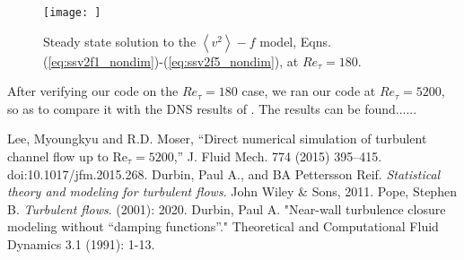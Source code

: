 \documentclass[a4paper,11pt]{article}
\newcommand{\chevron}[1]{\left\langle #1 \right\rangle}
\begin{document}
\begin{figure}
 \centering
 \texttt{[image: ]}
 \caption{Steady state solution to the $\chevron{v^2}-f$ model, Eqns.
(\ref{eq:ssv2f1_nondim})-(\ref{eq:ssv2f5_nondim}), at $Re_\tau=180$. }
 \label{fig:results_180}
\end{figure}


After verifying our code on the $Re_{\tau} = 180$ case, we ran our code at $Re_{\tau} = 5200$, so as to compare it with the DNS results of \cite{Lee}. The results can be found......


\clearpage
\begin{thebibliography}{3}
Lee, Myoungkyu and R.D. Moser, ``Direct numerical simulation of turbulent channel flow up to $\mathrm{Re}_{\tau}=5200$,'' J. Fluid Mech. 774 (2015) 395–415. doi:10.1017/jfm.2015.268.
    Durbin, Paul A., and BA Pettersson Reif. \textit{Statistical theory and
modeling for turbulent flows}. John Wiley \& Sons, 2011.
        Pope, Stephen B. \textit{Turbulent flows}. (2001): 2020.
        Durbin, Paul A. "Near-wall turbulence closure modeling without “damping
functions”." Theoretical and Computational Fluid Dynamics 3.1 (1991): 1-13.
 
\newpage



\end{thebibliography}
\end{document}
